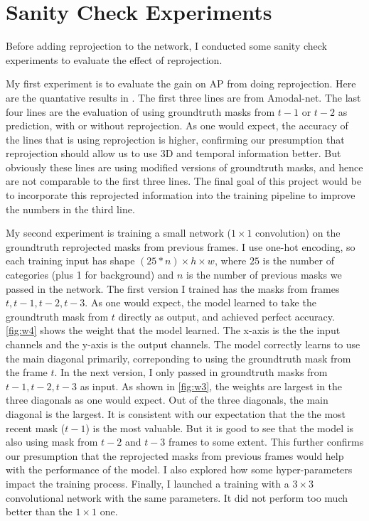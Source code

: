 \section{Sanity Check Experiments}
Before adding reprojection to the network, I conducted some sanity check experiments to evaluate the effect of reprojection. 

My first experiment is to evaluate the gain on AP from doing reprojection. Here are the quantative results in . The first three lines are from Amodal-net. The last four lines are the evaluation of using groundtruth masks from $t-1$ or $t-2$ as prediction, with or without reprojection. As one would expect, the accuracy of the lines that is using reprojection is higher, confirming our presumption that reprojection should allow us to use 3D and temporal information better. But obviously these lines are using modified versions of groundtruth masks, and hence are not comparable to the first three lines. The final goal of this project would be to incorporate this reprojected information into the training pipeline to improve the numbers in the third line.

My second experiment is training a small network ($1 \times 1$ convolution) on the groundtruth reprojected masks from previous frames. I use one-hot encoding, so each training input has shape $(25*n) \times h \times w$, where $25$ is the number of categories (plus 1 for background) and $n$ is the number of previous masks we passed in the network. The first version I trained has the masks from frames $t,t-1,t-2,t-3$. As one would expect, the model learned to take the groundtruth mask from $t$ directly as output, and achieved perfect accuracy. \ref{fig:w4} shows the weight that the model learned. The x-axis is the the input channels and the y-axis is the output channels. The model correctly learns to use the main diagonal primarily, correponding to using the groundtruth mask from the frame $t$. In the next version, I only passed in groundtruth masks from $t-1,t-2,t-3$ as input. As shown in \ref{fig:w3}, the weights are largest in the three diagonals as one would expect. Out of the three diagonals, the main diagonal is the largest. It is consistent with our expectation that the the most recent mask ($t-1$) is the most valuable. But it is good to see that the model is also using mask from $t-2$ and $t-3$ frames to some extent. This further confirms our presumption that the reprojected masks from previous frames would help with the performance of the model. I also explored how some hyper-parameters impact the training process. Finally, I launched a training with a $3\times 3$ convolutional network with the same parameters. It did not perform too much better than the $1\times 1$ one. 

